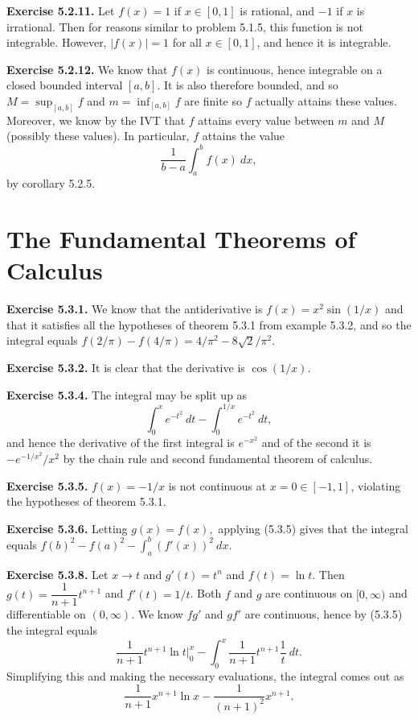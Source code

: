 \documentclass[12pt]{book}
\newcommand{\prb}[1]{\textbf{Exercise #1.}}
\begin{document}
\prb{5.2.11} Let $f(x) = 1$ if $x \in [0,1]$ is rational, and $-1$ if $x$ is irrational. Then for reasons similar to problem 5.1.5, this function is not integrable. However, $|f(x)| = 1$ for all $x \in [0,1]$, and hence it is integrable.

\prb{5.2.12} We know that $f(x)$ is continuous, hence integrable on a closed bounded interval $[a,b]$. It is also therefore bounded, and so $M = \sup_{[a,b]} f$ and $m = \inf_{[a,b]} f$ are finite so $f$ actually attains these values. Moreover, we know by the IVT that $f$ attains every value between $m$ and $M$ (possibly these values). In particular, $f$ attains the value $$\dfrac{1}{b-a} \int_a^b f(x) \ dx,$$ by corollary 5.2.5. 

\section{The Fundamental Theorems of Calculus}

\prb{5.3.1} We know that the antiderivative is $f(x) = x^2 \sin(1/x)$ and that it satisfies all the hypotheses of theorem 5.3.1 from example 5.3.2, and so the integral equals $f(2/\pi) - f(4/\pi) = 4/\pi^2 - 8\sqrt{2}/\pi^2.$

\prb{5.3.2} It is clear that the derivative is $\cos (1/x).$

\prb{5.3.4} The integral may be split up as $$\int_0^x e^{-t^2} \ dt - \int_0^{1/x} e^{-t^2} \ dt,$$ and hence the derivative of the first integral is $e^{-x^2}$ and of the second it is $-e^{-1/x^2}/x^2$ by the chain rule and second fundamental theorem of calculus. 

\prb{5.3.5} $f(x) = -1/x$ is not continuous at $x = 0 \in [-1, 1]$, violating the hypotheses of theorem 5.3.1.

\prb{5.3.6} Letting $g(x) = f(x),$ applying (5.3.5) gives that the integral equals $f(b)^2 - f(a)^2 - \displaystyle \int_a^b (f'(x))^2 \ dx.$ 

\prb{5.3.8} Let $x \rightarrow t$ and $g'(t) = t^n$ and $f(t) = \ln t$. Then $g(t) = \dfrac{1}{n+1} t^{n+1}$ and $f'(t) = 1/t$. Both $f$ and $g$ are continuous on $[0, \infty)$ and differentiable on $(0, \infty)$. We know $fg'$ and $gf'$ are continuous, hence by (5.3.5) the integral equals $$\dfrac{1}{n+1} t^{n+1} \ln t \bigg|_0^x - \int_0^x \dfrac{1}{n+1} t^{n+1} \dfrac{1}{t} \ dt.$$ Simplifying this and making the necessary evaluations, the integral comes out as $$\dfrac{1}{n+1} x^{n+1} \ln x - \dfrac{1}{(n+1)^2} x^{n+1}.$$
\end{document}
